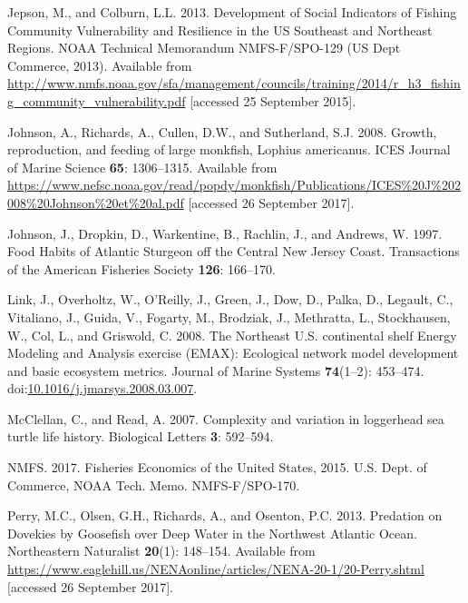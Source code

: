 \documentclass[11pt,]{article}
\begin{document}
\hypertarget{ref-jepson_development_2013}{}
Jepson, M., and Colburn, L.L. 2013. Development of Social Indicators of
Fishing Community Vulnerability and Resilience in the US Southeast and
Northeast Regions. NOAA Technical Memorandum NMFS-F/SPO-129 (US Dept
Commerce, 2013). Available from
\url{http://www.nmfs.noaa.gov/sfa/management/councils/training/2014/r_h3_fishing_community_vulnerability.pdf}
{[}accessed 25 September 2015{]}.

\hypertarget{ref-johnson_growth_2008}{}
Johnson, A., Richards, A., Cullen, D.W., and Sutherland, S.J. 2008.
Growth, reproduction, and feeding of large monkfish, Lophius americanus.
ICES Journal of Marine Science \textbf{65}: 1306--1315. Available from
\url{https://www.nefsc.noaa.gov/read/popdy/monkfish/Publications/ICES\%20J\%202008\%20Johnson\%20et\%20al.pdf}
{[}accessed 26 September 2017{]}.

\hypertarget{ref-johnson_food_1997}{}
Johnson, J., Dropkin, D., Warkentine, B., Rachlin, J., and Andrews, W.
1997. Food Habits of Atlantic Sturgeon off the Central New Jersey Coast.
Transactions of the American Fisheries Society \textbf{126}: 166--170.

\hypertarget{ref-link_northeast_2008}{}
Link, J., Overholtz, W., O'Reilly, J., Green, J., Dow, D., Palka, D.,
Legault, C., Vitaliano, J., Guida, V., Fogarty, M., Brodziak, J.,
Methratta, L., Stockhausen, W., Col, L., and Griswold, C. 2008. The
Northeast U.S. continental shelf Energy Modeling and Analysis exercise
(EMAX): Ecological network model development and basic ecosystem
metrics. Journal of Marine Systems \textbf{74}(1--2): 453--474.
doi:\href{https://doi.org/10.1016/j.jmarsys.2008.03.007}{10.1016/j.jmarsys.2008.03.007}.

\hypertarget{ref-mcclellan_complexity_2007}{}
McClellan, C., and Read, A. 2007. Complexity and variation in loggerhead
sea turtle life history. Biological Letters \textbf{3}: 592--594.

\hypertarget{ref-nmfs_fisheries_2017}{}
NMFS. 2017. Fisheries Economics of the United States, 2015. U.S. Dept.
of Commerce, NOAA Tech. Memo. NMFS-F/SPO-170.

\hypertarget{ref-perry_predation_2013}{}
Perry, M.C., Olsen, G.H., Richards, A., and Osenton, P.C. 2013.
Predation on Dovekies by Goosefish over Deep Water in the Northwest
Atlantic Ocean. Northeastern Naturalist \textbf{20}(1): 148--154.
Available from
\url{https://www.eaglehill.us/NENAonline/articles/NENA-20-1/20-Perry.shtml}
{[}accessed 26 September 2017{]}.
\end{document}
